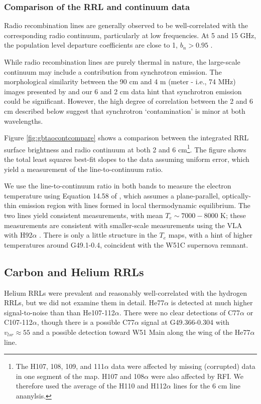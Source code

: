 \subsubsection{Comparison of the RRL and continuum data}
\label{sec:rrlvscont}
Radio recombination lines are generally observed to be well-correlated with the
corresponding radio continuum, particularly at low frequencies.  At 5 and 15
GHz, the population level departure coefficients are close to 1, $b_n > 0.95$
\citep{Wilson2009a,Walmsley1990a}.

While radio recombination lines are purely thermal in nature, the large-scale
continuum may include a contribution from synchrotron emission.  The
morphological similarity between the 90 cm and 4 m (meter - i.e., 74 MHz)
images presented by \citet{Brogan2013a} and our 6 and 2 cm data hint that
synchrotron emission could be significant.  However, the high degree of
correlation between the 2 and 6 cm described below suggest that synchrotron
`contamination' is minor at both wavelengths.

Figure \ref{fig:gbtaocontcompare} shows a comparison between the integrated RRL
surface brightness and radio continuum at both 2 and 6 cm\footnote{The H107,
108, 109, and 111$\alpha$ data were affected by missing (corrupted) data in one
segment of the map.  H107 and 108$\alpha$ were also affected by RFI.  We
therefore used the average of the H110 and H112$\alpha$ lines for the 6 cm line
ananylsis.}.  The figure shows
the total least squares best-fit slopes to the data assuming uniform error,
which yield a measurement of the line-to-continuum ratio.

We use the line-to-continuum ratio in both bands to measure the electron
temperature using Equation 14.58 of \citet{Wilson2009a}, which assumes a
plane-parallel, optically-thin emission region with lines formed in local
thermodynamic equilibrium.  The two lines yield consistent measurements, with
mean $T_e\sim7000-8000$ K; these measurements are consistent with smaller-scale
measurements using the VLA with H92$\alpha$ \citep{Mehringer1994a}.  There is
only a little structure in the $T_e$ maps, with a hint of higher temperatures
around G49.1-0.4, coincident with the W51C supernova remnant.

\subsection{Carbon and Helium RRLs}
Helium RRLs were prevalent and reasonably well-correlated with the hydrogen
RRLs, but we did not examine them in detail.  He77$\alpha$ is detected at much
higher signal-to-noise than than He107-112$\alpha$.  There were no clear
detections of C77$\alpha$ or C107-112$\alpha$, though there is a possible
C77$\alpha$ signal at G49.366-0.304 with $v_{lsr} \approx 55$ \kms and a
possible detection toward W51 Main along the wing of the He77$\alpha$ line.


